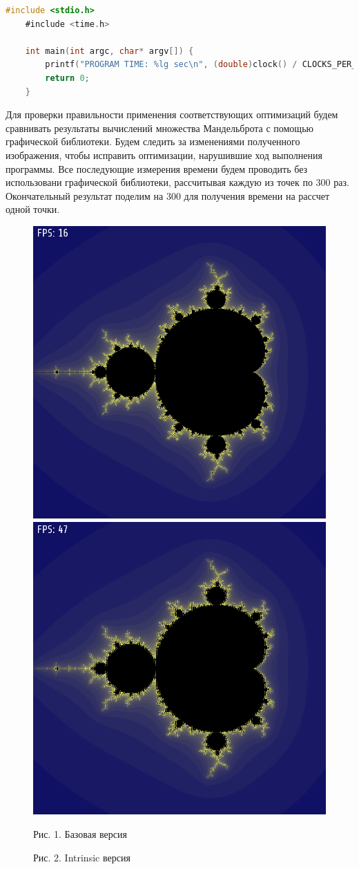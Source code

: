 \documentclass[12pt, letterpaper]{article}
\begin{document}
    \begin{lstlisting}[language=C]
    #include <stdio.h>
    #include <time.h>

    int main(int argc, char* argv[]) {
        printf("PROGRAM TIME: %lg sec\n", (double)clock() / CLOCKS_PER_SEC);
        return 0;
    }
    \end{lstlisting}

    \vspace{2cm}

    Для проверки правильности применения соответствующих оптимизаций будем сравнивать результаты вычислений множества Мандельброта с помощью графической библиотеки.
    Будем следить за изменениями полученного изображения, чтобы исправить оптимизации, нарушившие ход выполнения программы. Все последующие измерения времени будем проводить
    без использовани графической библиотеки, рассчитывая каждую из точек по 300 раз. Окончательный результат поделим на 300 для получения времени на рассчет одной точки.

    \begin{figure}[h]
        \begin{floatrow}
            \includegraphics[width=0.4\linewidth]{../data/imgs/mandelbrot.png}
            \hspace{1cm}
            \includegraphics[width=0.4\linewidth]{../data/imgs/Mandelbrot_v3_1.png}
        \end{floatrow}

        \parbox{0.48\textwidth}{\vspace{0.3cm} \centering \small Рис. 1. Базовая версия}
        \parbox{0.48\textwidth}{               \centering \small Рис. 2. Intrinsic версия}

    \end{figure}
\end{document}
